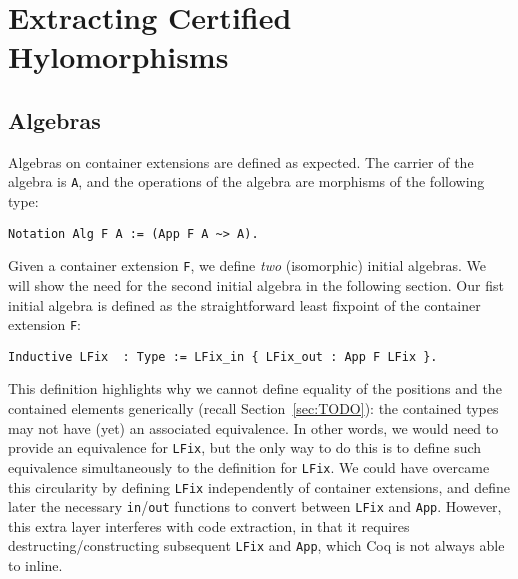 \documentclass[a4paper, UKenglish, cleveref, autoref, thm-restate]{lipics-v2021}
\begin{document}
\section{Extracting Certified Hylomorphisms}

\subsection{Algebras}

Algebras on container extensions are defined as expected. The carrier of the
algebra is \texttt{A}, and the operations of the algebra are morphisms
of the following type:
\begin{verbatim}
Notation Alg F A := (App F A ~> A).
\end{verbatim}
Given a container extension \texttt{F}, we define \emph{two}
(isomorphic) initial algebras. We will show the need for the second initial
algebra in the following section. Our fist initial algebra is defined as the
straightforward least fixpoint of the container extension \texttt{F}:
\begin{verbatim}
Inductive LFix  : Type := LFix_in { LFix_out : App F LFix }.
\end{verbatim}
This definition highlights why we cannot define equality of the positions and
the contained elements generically (recall Section~\ref{sec:TODO}): the
contained types may not have (yet) an associated equivalence. In other words,
we would need to provide an equivalence for \texttt{LFix}, but the
only way to do this is to define such equivalence simultaneously to the
definition for  \texttt{LFix}.  We could have overcame this
circularity by defining  \texttt{LFix} independently of container
extensions, and define later the necessary
\texttt{in}/\texttt{out} functions to convert between
\texttt{LFix} and \texttt{App}. However, this extra layer
interferes with code extraction, in that it requires destructing/constructing
subsequent \texttt{LFix} and  \texttt{App}, which Coq is not
always able to inline.
\end{document}
